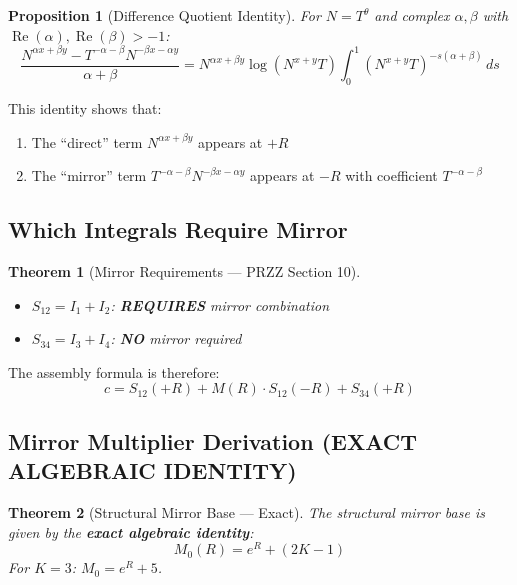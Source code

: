 \documentclass[11pt]{article}
\newtheorem{proposition}{Proposition}
\newtheorem{theorem}{Theorem}
\begin{document}
\begin{proposition}[Difference Quotient Identity]
For $N = T^\theta$ and complex $\alpha, \beta$ with $\operatorname{Re}(\alpha), \operatorname{Re}(\beta) > -1$:
\begin{equation}
\boxed{
\frac{N^{\alpha x + \beta y} - T^{-\alpha-\beta} N^{-\beta x - \alpha y}}{\alpha + \beta}
= N^{\alpha x + \beta y} \log(N^{x+y}T) \int_0^1 (N^{x+y}T)^{-s(\alpha+\beta)} \, ds
}
\end{equation}
\end{proposition}

This identity shows that:
\begin{enumerate}
\item The ``direct'' term $N^{\alpha x + \beta y}$ appears at $+R$
\item The ``mirror'' term $T^{-\alpha-\beta} N^{-\beta x - \alpha y}$ appears at $-R$ with coefficient $T^{-\alpha-\beta}$
\end{enumerate}

\subsection{Which Integrals Require Mirror}

\begin{theorem}[Mirror Requirements --- PRZZ Section 10]
\begin{itemize}
\item $S_{12} = I_1 + I_2$: \textbf{REQUIRES} mirror combination
\item $S_{34} = I_3 + I_4$: \textbf{NO} mirror required
\end{itemize}
\end{theorem}

The assembly formula is therefore:
\begin{equation}
\boxed{c = S_{12}(+R) + M(R) \cdot S_{12}(-R) + S_{34}(+R)}
\end{equation}

\subsection{Mirror Multiplier Derivation (EXACT ALGEBRAIC IDENTITY)}

\begin{theorem}[Structural Mirror Base --- Exact]
\label{thm:mirror-base}
The structural mirror base is given by the \textbf{exact algebraic identity}:
\begin{equation}
\boxed{M_0(R) = e^R + (2K-1)}
\end{equation}
For $K=3$: $M_0 = e^R + 5$.
\end{theorem}
\end{document}
